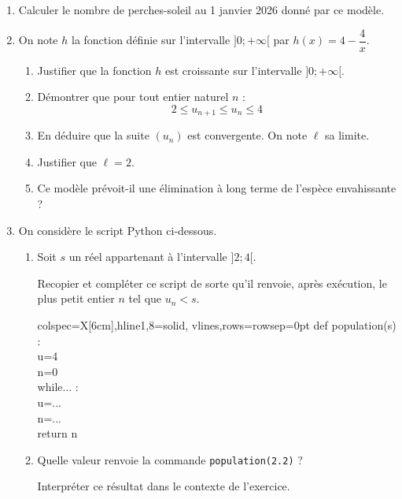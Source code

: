 \documentclass[10pt]{article}
\begin{document}
\begin{enumerate}
\item Calculer le nombre de perches-soleil au 1 janvier 2026 donné par ce modèle.
\item On note $h$ la fonction définie sur l'intervalle $] 0;+\infty[$ par  \quad $h(x)=4-\dfrac{4}{x}$.
	\begin{enumerate}
		\item Justifier que la fonction $h$ est croissante sur l'intervalle $] 0;+\infty[$.
		\item Démontrer que pour tout entier naturel $n$ :
\[ 2 \leqslant u_{n+1} \leqslant u_{n} \leqslant 4 \]

		\item En déduire que la suite $\left(u_{n}\right)$ est convergente. On note $\ell$ sa limite.
		\item Justifier que $\ell = 2$.
		\item Ce modèle prévoit-il une élimination à long terme de l'espèce envahissante ?
	\end{enumerate}

\item On considère le script Python ci-dessous.
	\begin{enumerate}
		\item Soit $s$ un réel appartenant à l'intervalle $] 2; 4[$.
		
Recopier et compléter ce script de sorte qu'il renvoie, après exécution, le plus petit entier $n$ tel que $u_{n}<s$.

\begin{center}
\begin{ttfamily}
\begin{tblr}{colspec={X[6cm]},hline{1,8}={solid},
	vlines,rows={rowsep=0pt}}
	def population(s) :\\
	\quad u=4\\
	\quad n=0\\
	\quad while... :\\
	\quad \quad u=...\\
	\quad \quad n=...\\
	\quad return n
	\end{tblr}
	\end{ttfamily}
\end{center}
		\item Quelle valeur renvoie la commande \texttt{population(2.2)} ?

		Interpréter ce résultat dans le contexte de l'exercice.
	\end{enumerate}
\end{enumerate}
\end{document}
